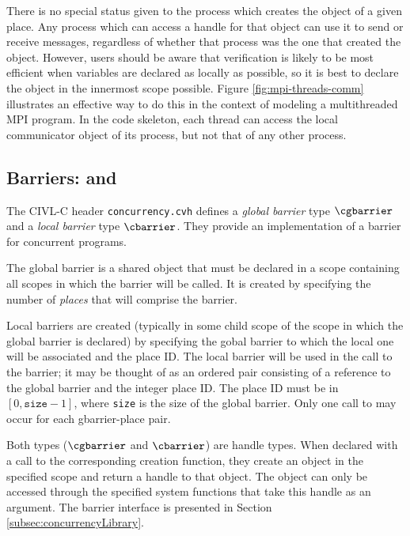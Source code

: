 There is no special status given to the process which creates the
\ccomm{} object of a given place.  Any process which can access a
handle for that \ccomm{} object can use it to send or receive
messages, regardless of whether that process was the one that created
the \ccomm{} object.  However, users should be aware that verification
is likely to be most efficient when variables are declared as locally
as possible, so it is best to declare the \ccomm{} object in the
innermost scope possible.  Figure \ref{fig:mpi-threads-comm}
illustrates an effective way to do this in the context of modeling a
multithreaded MPI program.  In the code skeleton, each thread can
access the local communicator object of its process, but not that of
any other process.

\subsection{Barriers: \cgbarrier{} and \cbarrier}
\label{sec:barriers}

The CIVL-C header \texttt{concurrency.cvh} defines a \emph{global barrier} type $\cgbarrier$ and a
\emph{local barrier} type $\cbarrier$. They provide an implementation of 
a barrier for concurrent programs.

The global barrier is a shared object that must be declared in
a scope containing all scopes in which the barrier will be called.
 It is created by specifying the number of
\emph{places} that will comprise the barrier. 

Local barriers are created (typically in some child scope of the
scope in which the global barrier is declared) by specifying the
gobal barrier to which the local one will be associated and the
place ID. The local barrier will be used in the call to the barrier; 
it may be thought of as an ordered pair
consisting of a reference to the global barrier and the integer
place ID.  The place ID must be in $[0,\texttt{size}-1]$, where
\texttt{size} is the size of the global barrier.    
Only one call to \cbarriercreate{}
may occur for each gbarrier-place pair.


Both types ($\cgbarrier$ and $\cbarrier$) are handle types. When declared
with a call to the corresponding creation function, they create an
object in the specified scope and return a handle to that object. The
object can only be accessed through the specified system functions
that take this handle as an argument. The barrier interface is presented in Section \ref{subsec:concurrencyLibrary}.

